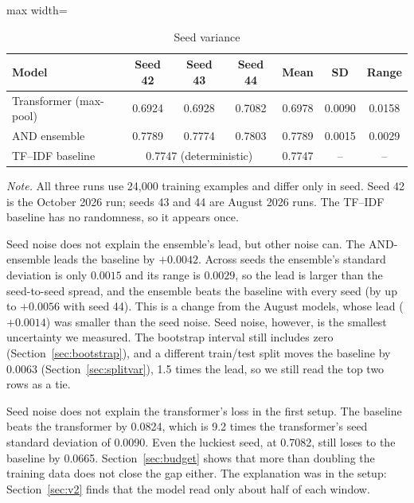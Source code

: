 \begin{table}[!htbp]
\centering
\caption{Seed variance}
\label{tab:seeds}
\small
\begin{adjustbox}{max width=\textwidth}
\begin{tabular}{lcccccc}
\toprule
\textbf{Model} & \textbf{Seed 42} & \textbf{Seed 43} & \textbf{Seed 44} & \textbf{Mean} & \textbf{SD} & \textbf{Range}\\
\midrule
Transformer (max-pool) & 0.6924 & 0.6928 & 0.7082 & 0.6978 & 0.0090 & 0.0158\\
AND ensemble           & 0.7789 & 0.7774 & 0.7803 & 0.7789 & 0.0015 & 0.0029\\
\midrule
TF--IDF baseline       & \multicolumn{3}{c}{0.7747 (deterministic)} & 0.7747 & -- & -- \\
\bottomrule
\end{tabular}
\end{adjustbox}

{\footnotesize\singlespacing \emph{Note.} All three runs use 24{,}000 training examples and differ only in seed. Seed 42 is the October 2026 run; seeds 43 and 44 are August 2026 runs. The TF--IDF baseline has no randomness, so it appears once.\par}
\end{table}

Seed noise does not explain the ensemble's lead, but other noise can. The AND-ensemble leads the baseline by $+0.0042$. Across seeds the ensemble's standard deviation is only $0.0015$ and its range is $0.0029$, so the lead is larger than the seed-to-seed spread, and the ensemble beats the baseline with every seed (by up to $+0.0056$ with seed 44). This is a change from the August models, whose lead ($+0.0014$) was smaller than the seed noise. Seed noise, however, is the smallest uncertainty we measured. The bootstrap interval still includes zero (Section~\ref{sec:bootstrap}), and a different train/test split moves the baseline by $0.0063$ (Section~\ref{sec:splitvar}), 1.5 times the lead, so we still read the top two rows as a tie.

Seed noise does not explain the transformer's loss in the first setup. The baseline beats the transformer by 0.0824, which is 9.2 times the transformer's seed standard deviation of 0.0090. Even the luckiest seed, at 0.7082, still loses to the baseline by 0.0665. Section~\ref{sec:budget} shows that more than doubling the training data does not close the gap either. The explanation was in the setup: Section~\ref{sec:v2} finds that the model read only about half of each window.

